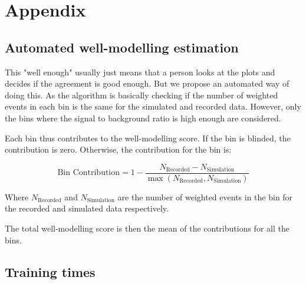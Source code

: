 \section{Appendix}


\subsection{Automated well-modelling estimation}

This "well enough" usually just means that a person looks at the plots and decides if the agreement is good enough.
But we propose an automated way of doing this. As the algorithm is basically checking if the number of weighted events
in each bin is the same for the simulated and recorded data. However, only the bins where the signal to background ratio
is high enough are considered.

Each bin thus contributes to the well-modelling score. If the bin is blinded, the contribution is zero. Otherwise, the
contribution for the bin is:

$$
    \text{Bin Contribution} = 1 - \frac{N_\text{Recorded} - N_\text{Simulation}}{\max(N_\text{Recorded}, N_\text{Simulation})}
$$

Where $N_\text{Recorded}$ and $N_\text{Simulation}$ are the number of weighted events in the bin for the recorded and
simulated data respectively.

The total well-modelling score is then the mean of the contributions for all the bins.



\subsection{Training times}